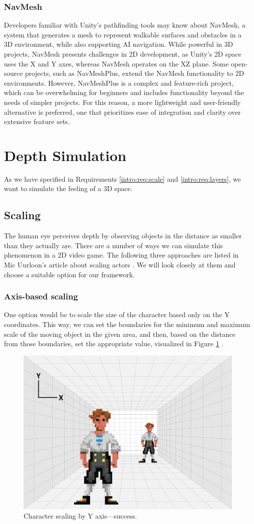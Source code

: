 \subsubsection{NavMesh}
Developers familiar with Unity’s pathfinding tools may know about NavMesh, a system that generates a mesh to represent walkable surfaces and obstacles in a 3D environment, while also supporting AI navigation. While powerful in 3D projects, NavMesh presents challenges in 2D development, as Unity's 2D space uses the X and Y axes, whereas NavMesh operates on the XZ plane. Some open-source projects, such as NavMeshPlus, extend the NavMesh functionality to 2D environments. However, NavMeshPlus is a complex and feature-rich project, which can be overwhelming for beginners and includes functionality beyond the needs of simpler projects. For this reason, a more lightweight and user-friendly alternative is preferred, one that prioritizes ease of integration and clarity over extensive feature sets. 

\section{Depth Simulation}
As we have specified in Requirements \ref{intro:req:scale} and \ref{intro:req:layers}, we want to simulate the feeling of a 3D space. 

\subsection{Scaling}
\label{analysis:depth:scaling}
The human eye perceives depth by observing objects in the distance as smaller than they actually are. There are a number of ways we can simulate this phenomenon in a 2D video game. The following three approaches are listed in Mic Uurloon's article about scaling actors \cite{Uurloon3}. We will look closely at them and choose a suitable option for our framework.

\subsubsection{Axis-based scaling}
One option would be to scale the size of the character based only on the Y coordinates. This way, we can set the boundaries for the minimum and maximum scale of the moving object in the given area, and then, based on the distance from those boundaries, set the appropriate value, visualized in Figure \ref{fig:Room} . 

\begin{figure}[H]
\centering
\includegraphics[width=.5\linewidth]{img/room2.png}
\caption{Character scaling by Y axis—success.}
\label{fig:Room}
\end{figure}

